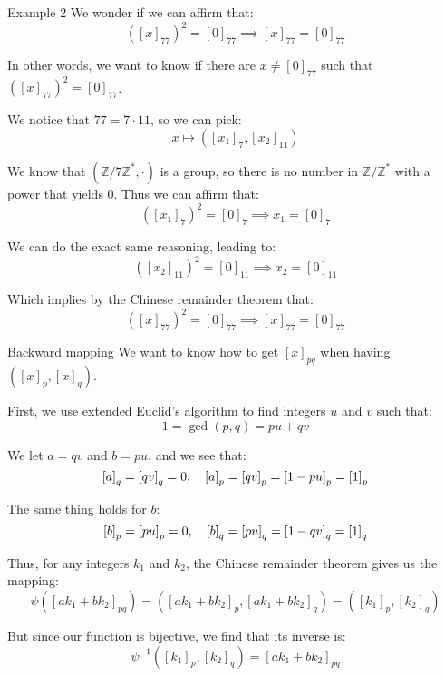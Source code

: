 \documentclass[a4paper]{article}
\begin{document}
\begin{parag}{Example 2}
    We wonder if we can affirm that:
    \[\left(\left[x\right]_{77}\right)^2 = \left[0\right]_{77} \implies \left[x\right]_{77} = \left[0\right]_{77}\]

    In other words, we want to know if there are $x \neq \left[0\right]_{77}$ such that $\left(\left[x\right]_{77}\right)^2 = \left[0\right]_{77}$.

    We notice that $77 = 7\cdot 11$, so we can pick:
    \[x \mapsto \left(\left[x_1\right]_7, \left[x_2\right]_{11}\right)\]

    We know that $\left(\mathbb{Z} / 7\mathbb{Z}^*, \cdot\right)$ is a group, so there is no number in $\mathbb{Z} / \mathbb{Z}^*$ with a power that yields 0. Thus we can affirm that:
    \[\left(\left[x_1\right]_{7}\right)^2 = \left[0\right]_7 \implies x_1 = \left[0\right]_7\]

    We can do the exact same reasoning, leading to:
    \[\left(\left[x_2\right]_{11}\right)^2 = \left[0\right]_{11} \implies x_2 = \left[0\right]_{11}\]

    Which implies by the Chinese remainder theorem that:
    \[\left(\left[x\right]_{77}\right)^2 = \left[0\right]_{77} \implies \left[x\right]_{77} = \left[0\right]_{77}\]
\end{parag}

\begin{parag}{Backward mapping}
    We want to know how to get $\left[x\right]_{pq}$ when having $\left(\left[x\right]_p, \left[x\right]_q\right)$.

    First, we use extended Euclid's algorithm to find integers $u$ and $v$ such that:
    \[1 = \gcd\left(p, q\right) = pu + qv\]

    We let $a = qv$ and $b = pu$, and we see that:
    \[\left[a\right]_q = \left[qv\right]_q = 0, \mathspace \left[a\right]_p = \left[qv\right]_p = \left[1 - pu\right]_p = \left[1\right]_p\]

    The same thing holds for $b$:
    \[\left[b\right]_p = \left[pu\right]_p = 0, \mathspace \left[b\right]_q = \left[pu\right]_q = \left[1 - qv\right]_q = \left[1\right]_q\]

    Thus, for any integers $k_1$ and $k_2$, the Chinese remainder theorem gives us the mapping:
    \[\psi\left(\left[a k_1 + b k_2\right]_{pq}\right) = \left(\left[ak_1 + bk_2\right]_p, \left[ak_1 + bk_2\right]_q\right) = \left(\left[k_1\right]_{p}, \left[k_2\right]_{q}\right)\]

    But since our function is bijective, we find that its inverse is:
    \[\psi^{-1}\left(\left[k_1\right]_p, \left[k_2\right]_q\right) = \left[a k_1 + b k_2\right]_{pq}\]
\end{parag}
\end{document}
